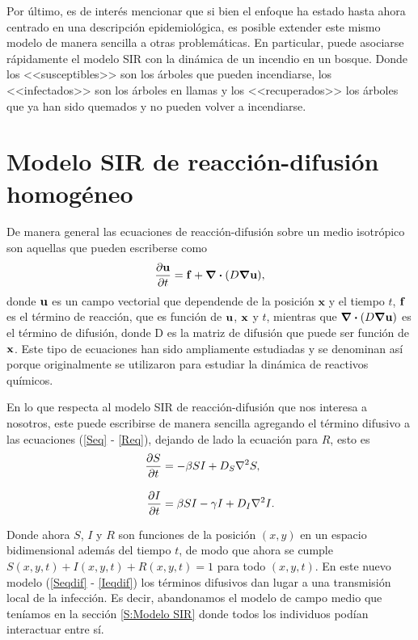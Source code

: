 Por último, es de interés mencionar que si bien el enfoque ha estado hasta ahora centrado en una descripción epidemiológica, es posible extender este 
mismo modelo de manera sencilla a otras problemáticas. En particular, puede asociarse rápidamente el modelo SIR con la dinámica
de un incendio en un bosque. Donde los <<susceptibles>> son los árboles que pueden incendiarse, los <<infectados>> son los árboles en 
llamas y los <<recuperados>> los árboles que ya han sido quemados y no pueden volver a incendiarse.


\section{Modelo SIR de reacción-difusión homogéneo}
\label{S:Modelo SIR espacial hom}

De manera general las ecuaciones de reacción-difusión sobre un medio isotrópico son aquellas que pueden escriberse como
\begin{equation}
  \pdv{\vb{u}}{t} = \vb{f} + \div(D\grad{\vb{u}}),
\end{equation}
donde $\vb{u}$ es un campo vectorial que dependende de la posición $\mathbf{x}$ y el tiempo $t$, $\vb{f}$ es el término de reacción, que es función de 
$\vb u$, $\vb x$ y $t$, mientras que $\div(D\grad{\vb{u}})$ es el término de difusión, donde D es la matriz de difusión que puede ser función de $\vb x$.
Este tipo de ecuaciones han sido ampliamente estudiadas \cite{keeling:infectious_diseases,Murray2002,Murray2003,coulson_1958} y se denominan así porque originalmente 
se utilizaron para estudiar la dinámica de reactivos químicos.\cite{turing52the}

En lo que respecta al modelo SIR de reacción-difusión que nos interesa a nosotros, este puede escribirse de manera sencilla agregando 
el término difusivo a las ecuaciones (\ref{Seq} - \ref{Req}), dejando de lado la ecuación para $R$, esto es 
\begin{align}
  \pdv{S}{t}&=-\beta SI + D_{S} \laplacian{S},\label{Seqdif}\\[.3cm]
  \pdv{I}{t}&=\beta SI - \gamma I + D_{I} \laplacian{I}.\label{Ieqdif}
\end{align}

Donde ahora $S$, $I$ y $R$ son funciones de la posición $(x,y)$ en un espacio bidimensional además del tiempo $t$, de modo que ahora 
se cumple $S(x,y,t)+I(x,y,t)+R(x,y,t)=1$ para todo $(x,y,t)$. En este nuevo modelo 
(\ref{Seqdif} - \ref{Ieqdif}) los términos difusivos dan lugar a una transmisión local de la infección. Es decir, abandonamos el modelo de campo medio que teníamos en la sección \ref{S:Modelo SIR} donde todos
los individuos podían interactuar entre sí.

